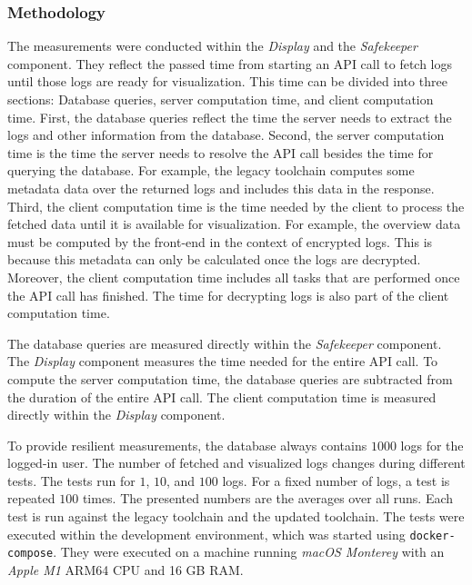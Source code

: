 \documentclass[../main.tex]{subfiles}
\begin{document}
\subsubsection{Methodology}

The measurements were conducted within the \emph{Display} and the \emph{Safekeeper} component.
They reflect the passed time from starting an API call to fetch logs until those logs are ready for visualization.
This time can be divided into three sections: Database queries, server computation time, and client computation time.
First, the database queries reflect the time the server needs to extract the logs and other information from the database.
Second, the server computation time is the time the server needs to resolve the API call besides the time for querying the database.
For example, the legacy toolchain computes some metadata data over the returned logs and includes this data in the response.
Third, the client computation time is the time needed by the client to process the fetched data until it is available for visualization.
For example, the overview data must be computed by the front-end in the context of encrypted logs.
This is because this metadata can only be calculated once the logs are decrypted.
Moreover, the client computation time includes all tasks that are performed once the API call has finished.
The time for decrypting logs is also part of the client computation time.

The database queries are measured directly within the \emph{Safekeeper} component.
The \emph{Display} component measures the time needed for the entire API call.
To compute the server computation time, the database queries are subtracted from the duration of the entire API call.
The client computation time is measured directly within the \emph{Display} component.

To provide resilient measurements, the database always contains $1000$ logs for the logged-in user.
The number of fetched and visualized logs changes during different tests.
The tests run for $1$, $10$, and $100$ logs.
For a fixed number of logs, a test is repeated $100$ times.
The presented numbers are the averages over all runs.
Each test is run against the legacy toolchain and the updated toolchain.
The tests were executed within the development environment, which was started using \verb|docker-compose|.
They were executed on a machine running \emph{macOS Monterey} with an \emph{Apple M1} ARM64 CPU and 16 GB RAM.
\end{document}
